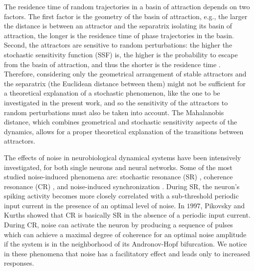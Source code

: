 The residence time of random trajectories in a basin of attraction
depends on two factors. The first factor is the  geometry 
of the  basin of attraction, e.g., the larger the
distance is between an attractor and the separatrix isolating its
basin of attraction, the longer is the residence time of phase
trajectories in the basin. Second, the 
attractors are sensitive to random perturbations: the higher the stochastic
sensitivity function (SSF) is, the higher is the probability to
escape from the basin of attraction, and thus the shorter is the
residence time \cite{M.I Freidlin}. Therefore, considering only
the geometrical arrangement of stable attractors and the
separatrix (the Euclidean distance between them) might not be
sufficient for a theoretical explanation of a stochastic
phenomenon, like the one  to be investigated in the present work, and so the
sensitivity of the attractors to random perturbations must also be
taken into account. The Mahalanobis distance, which combines
geometrical and stochastic sensitivity aspects of the dynamics,
allows for a proper theoretical explanation of the transitions
between attractors.

The effects of
noise in neurobiological dynamical systems have been intensively investigated, for both single
neurons and neural networks. Some of the most
studied noise-induced phenomena are: stochastic resonance (SR)
\cite{Lindner,Longtin,Collins}, coherence resonance (CR)
\cite{Pikovsky}, and noise-induced synchronization
\cite{Kim}. During SR, the neuron's spiking activity becomes
more closely correlated with a sub-threshold periodic input current
in the presence of an optimal level of noise. In $1997$, Pikovsky
and Kurths showed that CR is basically SR in the absence of a
periodic input current. During CR, noise can activate the
neuron by producing a sequence of pulses which can achieve a
maximal degree of coherence for an optimal noise amplitude if the system is
in the neighborhood of its Andronov-Hopf bifurcation. We notice in
these phenomena that noise has a facilitatory effect and leads only to
increased responses.

